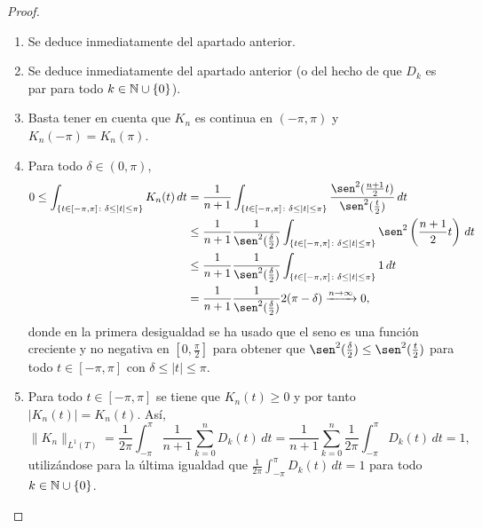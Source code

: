 \documentclass[a4paper, 11pt, oneside]{report}
\begin{document}
\begin{proof}
\begin{enumerate}
  \item Se deduce inmediatamente del apartado anterior.
  \item Se deduce inmediatamente del apartado anterior (o del hecho de que $D_k$ es par para todo $k \in \mathbb N \cup \{0\}$).
  \item Basta tener en cuenta que $K_n$ es continua en $(-\pi,\pi)$ y $K_n(-\pi) = K_n(\pi)$.
  \item Para todo $\delta \in (0,\pi)$,
  \[\begin{aligned}[t]
    0 \leq \int_{\{t \in [-\pi,\pi] \colon \delta \leq |t| \leq \pi\}} K_n(t) \, dt &= \frac{1}{n+1}\int_{\{t \in [-\pi,\pi] \colon \delta \leq |t| \leq \pi\}} \frac{\sen^2(\frac{n+1}{2}t)}{\sen^2(\frac{t}{2})} \, dt \\
    &\leq \frac{1}{n+1} \frac{1}{\sen^2(\frac{\delta}{2})} \int_{\{t \in [-\pi,\pi] \colon \delta \leq |t| \leq \pi\}} \sen^2\left(\frac{n+1}{2}t\right) \, dt \\
    &\leq \frac{1}{n+1}\frac{1}{\sen^2(\frac{\delta}{2})} \int_{\{t \in [-\pi,\pi] \colon \delta \leq |t| \leq \pi\}} 1 \, dt \\
    &= \frac{1}{n+1}\frac{1}{\sen^2(\frac{\delta}{2})} 2(\pi - \delta) \xrightarrow{n \to \infty} 0,
  \end{aligned}\]
  donde en la primera desigualdad se ha usado que el seno es una función creciente y no negativa en $[0,\frac{\pi}{2}]$ para obtener que $\sen^2(\frac{\delta}{2}) \leq \sen^2(\frac{t}{2})$ para todo $t \in [-\pi,\pi]$ con $\delta \leq |t| \leq \pi$.
  \item Para todo $t \in [-\pi,\pi]$ se tiene que $K_n(t) \geq 0$ y por tanto $|K_n(t)|=K_n(t)$. Así,
  \[\|K_n\|_{L^1(T)}  = \frac{1}{2\pi}\int_{-\pi}^\pi \frac{1}{n+1}\sum_{k=0}^n D_k(t) \, dt = \frac{1}{n+1}\sum_{k=0}^n\frac{1}{2\pi}\int_{-\pi}^\pi D_k(t) \, dt=1,\]
  utilizándose para la última igualdad que $\frac{1}{2\pi}\int_{-\pi}^\pi D_k(t) \, dt = 1$ para todo $k \in \mathbb N \cup \{0\}$. \qedhere
  \end{enumerate}
\end{proof}
\end{document}
